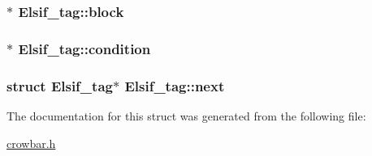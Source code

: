 \subsubsection[{block}]{$\ast$ Elsif\+\_\+tag\+::block}\label{struct_elsif__tag_a9194a341db2b2733748ce1d7b9ad6dd9}
\hypertarget{struct_elsif__tag_a90add539e16a341fa17d195711585561}{}
\subsubsection[{condition}]{$\ast$ Elsif\+\_\+tag\+::condition}\label{struct_elsif__tag_a90add539e16a341fa17d195711585561}
\hypertarget{struct_elsif__tag_a8a3bbc2610b58f08517837ee97da2549}{}
\subsubsection[{next}]{\setlength{\rightskip}{0pt plus 5cm}struct {\bf Elsif\+\_\+tag}$\ast$ Elsif\+\_\+tag\+::next}\label{struct_elsif__tag_a8a3bbc2610b58f08517837ee97da2549}


The documentation for this struct was generated from the following file\+:\begin{DoxyCompactItemize}
\item 
\hyperlink{crowbar_8h}{crowbar.\+h}\end{DoxyCompactItemize}
